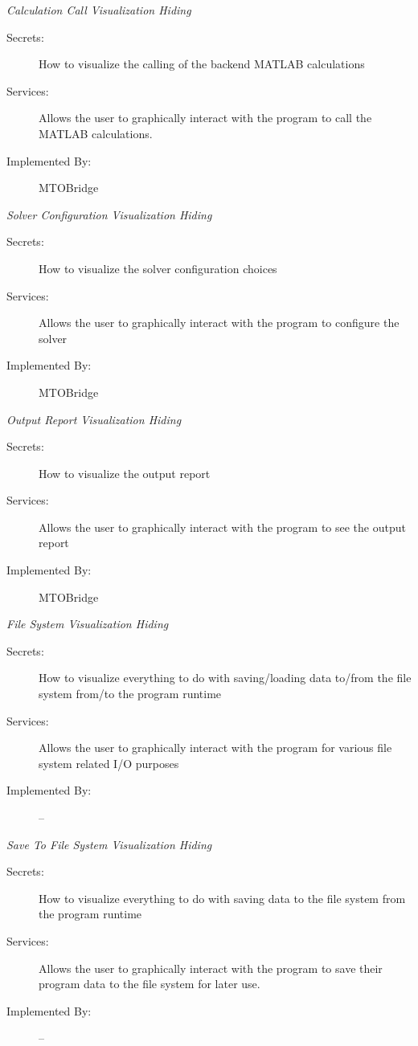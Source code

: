 \documentclass[12pt, titlepage]{article}
\begin{document}
    \emph{{\large Calculation Call Visualization Hiding}}
    \begin{description}
        \item[Secrets:]How to visualize the calling of the backend MATLAB calculations
        \item[Services:]Allows the user to graphically interact with the program to call the MATLAB calculations.
        \item[Implemented By:] MTOBridge\\
    \end{description}
    \emph{{\large Solver Configuration Visualization Hiding}}
    \begin{description}
        \item[Secrets:]How to visualize the solver configuration choices
        \item[Services:]Allows the user to graphically interact with the program to configure the solver
        \item[Implemented By:] MTOBridge\\
    \end{description}
    \emph{{\large Output Report Visualization Hiding}}
    \begin{description}
        \item[Secrets:]How to visualize the output report
        \item[Services:]Allows the user to graphically interact with the program to see the output report
        \item[Implemented By:] MTOBridge\\
    \end{description}
    \emph{{\large File System Visualization Hiding}}
    \begin{description}
        \item[Secrets:]How to visualize everything to do with saving/loading data to/from the file system from/to the program runtime
        \item[Services:]Allows the user to graphically interact with the program for various file system related I/O purposes
        \item[Implemented By:] --\\
    \end{description}
    \emph{{\large Save To File System Visualization Hiding}}
    \begin{description}
        \item[Secrets:]How to visualize everything to do with saving data to the file system from the program runtime
        \item[Services:]Allows the user to graphically interact with the program to save their program data to the file system for later use.
        \item[Implemented By:] --\\
    \end{description}
\end{document}
